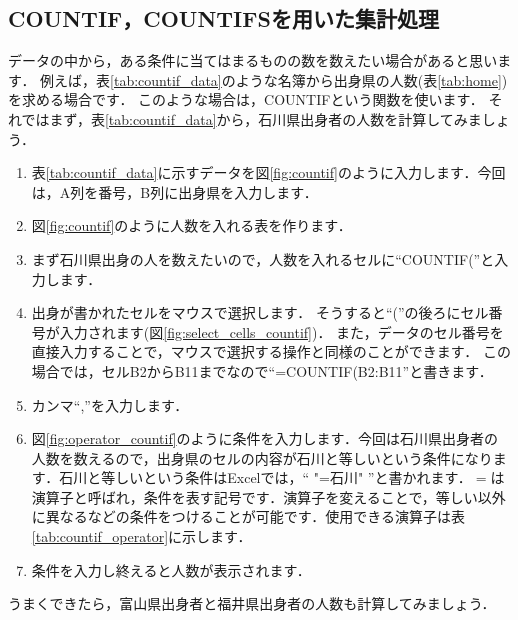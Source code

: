 \clearpage

\subsection{COUNTIF，COUNTIFSを用いた集計処理}

データの中から，ある条件に当てはまるものの数を数えたい場合があると思います．
例えば，表\ref{tab:countif_data}のような名簿から出身県の人数(表\ref{tab:home})を求める場合です．
このような場合は，COUNTIFという関数を使います．
それではまず，表\ref{tab:countif_data}から，石川県出身者の人数を計算してみましょう．
\begin{enumerate}
    \item 表\ref{tab:countif_data}に示すデータを図\ref{fig:countif}のように入力します．今回は，A列を番号，B列に出身県を入力します．
    \item 図\ref{fig:countif}のように人数を入れる表を作ります．
    \item まず石川県出身の人を数えたいので，人数を入れるセルに``COUNTIF(''と入力します．
    \item 出身が書かれたセルをマウスで選択します．
    そうすると``(''の後ろにセル番号が入力されます(図\ref{fig:select_cells_countif})．
    また，データのセル番号を直接入力することで，マウスで選択する操作と同様のことができます．
    この場合では，セルB2からB11までなので``=COUNTIF(B2:B11''と書きます．
    \item カンマ``,''を入力します．
    \item 図\ref{fig:operator_countif}のように条件を入力します．今回は石川県出身者の人数を数えるので，出身県のセルの内容が石川と等しいという条件になります．石川と等しいという条件はExcelでは，`` "=石川" ''と書かれます．$=$は演算子と呼ばれ，条件を表す記号です．演算子を変えることで，等しい以外に異なるなどの条件をつけることが可能です．使用できる演算子は表\ref{tab:countif_operator}に示します．
    \item 条件を入力し終えると人数が表示されます．
\end{enumerate}
うまくできたら，富山県出身者と福井県出身者の人数も計算してみましょう．

